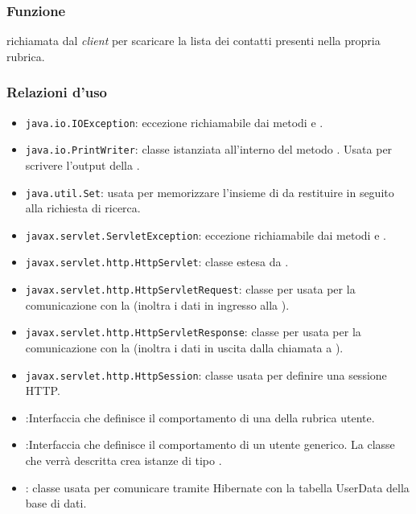 

\subsubsection*{Funzione}
 richiamata dal \textit{client} per scaricare la lista dei contatti presenti nella propria rubrica.

\subsubsection*{Relazioni d'uso}

\begin{itemize}
	\item \texttt{java.io.IOException}: eccezione richiamabile dai metodi  e .
	\item \texttt{java.io.PrintWriter}: classe istanziata all'interno del metodo . Usata per scrivere l'output della .
	\item \texttt{java.util.Set}: usata per memorizzare l'insieme di  da restituire in seguito alla richiesta di ricerca.
	\item \texttt{javax.servlet.ServletException}: eccezione richiamabile dai metodi  e .
	\item \texttt{javax.servlet.http.HttpServlet}: classe estesa da .
	\item \texttt{javax.servlet.http.HttpServletRequest}:  classe per usata per la comunicazione con la  (inoltra i dati in ingresso alla ).
	\item \texttt{javax.servlet.http.HttpServletResponse}: classe per usata per la comunicazione con la  (inoltra i dati in uscita dalla chiamata a ).
	\item \texttt{javax.servlet.http.HttpSession}: classe usata per definire una sessione HTTP.
	\item {}:Interfaccia che definisce il comportamento di una  della rubrica utente.
	\item {}:Interfaccia che definisce il comportamento di un utente generico. La classe che verrà descritta crea istanze di tipo .
	\item {}: classe usata per comunicare tramite Hibernate con la tabella UserData della base di dati.
\end{itemize}

